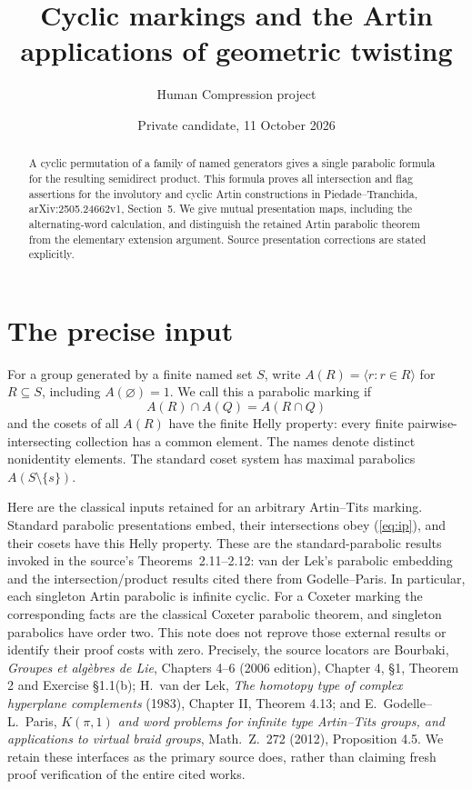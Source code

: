 
\title{Cyclic markings and the Artin applications of geometric twisting}
\author{Human Compression project}
\date{Private candidate, 11 October 2026}

\maketitle
\begin{abstract}
A cyclic permutation of a family of named generators gives a single
parabolic formula for the resulting semidirect product. This formula proves
all intersection and flag assertions for the involutory and cyclic Artin
constructions in Piedade--Tranchida, arXiv:2505.24662v1, Section~5.
We give mutual presentation maps, including the alternating-word calculation,
and distinguish the retained Artin parabolic theorem from the elementary
extension argument. Source presentation corrections are stated explicitly.
\end{abstract}

\section{The precise input}
For a group generated by a finite named set $S$, write
$A(R)=\langle r:r\in R\rangle$ for $R\subseteq S$, including
$A(\varnothing)=1$. We call this a parabolic marking if
\begin{equation}\label{eq:ip}
 A(R)\cap A(Q)=A(R\cap Q)
\end{equation}
and the cosets of all $A(R)$ have the finite Helly property: every finite
pairwise-intersecting collection has a common element. The names denote
distinct nonidentity elements. The standard coset system has maximal
parabolics $A(S\setminus\{s\})$.

Here are the classical inputs retained for an arbitrary Artin--Tits
marking. Standard parabolic presentations embed, their intersections obey
(\ref{eq:ip}), and their cosets have this Helly property. These are the
standard-parabolic results invoked in the source's Theorems~2.11--2.12:
van der Lek's parabolic embedding and the intersection/product results
cited there from Godelle--Paris. In particular, each singleton Artin
parabolic is infinite cyclic. For a Coxeter marking the corresponding
facts are the classical Coxeter parabolic theorem, and singleton
parabolics have order two. This note does not reprove those external
results or identify their proof costs with zero.
Precisely, the source locators are Bourbaki, \emph{Groupes et alg\`ebres
de Lie}, Chapters 4--6 (2006 edition), Chapter 4, \S1, Theorem 2
and Exercise \S1.1(b); H.~van der Lek, \emph{The homotopy type of
complex hyperplane complements} (1983), Chapter II, Theorem 4.13;
and E.~Godelle--L.~Paris, \emph{$K(\pi,1)$ and word problems for
infinite type Artin--Tits groups, and applications to virtual braid
groups}, Math.~Z.~272 (2012), Proposition 4.5. We retain these
interfaces as the primary source does, rather than claiming fresh
proof verification of the entire cited works.

